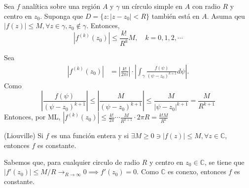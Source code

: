 \begin{prop}
    Sea $f$ analítica sobre una región $A$ y $\gamma$ un círculo simple en $A$ con radio $R$ y centro en $z_0$. Suponga que 
    $D=\{z: |z-z_0|<R\}$ también está en $A$. Asuma qeu $|f(z)|\leq M,\forall z\in \gamma,z_0\not\in \gamma$. Entonces, 
    $$|f^{(k)}(z_0)|\leq \frac{k!}{R^k}M,\quad k=0,1,2,\cdots$$
    \begin{dem}
        Sea 
        \begin{align*}
            |f^{(k)}(z_0)| &= \left|\frac{k!}{2\pi i}\right|\cdot \left|\int_\gamma \frac{f(\psi)}{(\psi -z_0)^{k+1}}d\psi\right|.
        \end{align*}
        Como 
        $$\left| \frac{f(\psi)}{(\psi -z_0)^{k+1}}\right|\leq \left| \frac{M}{(\psi -z_0)^{k+1}}\right|\leq \frac{M}{|\psi -z_0|^{k+1}}=\frac{M}{R^{k+1}}$$
        Entonces, por ML, $|f^{(k)}(z_0)|\leq \frac{k!}{2\pi}\cdots \frac{M}{R^{k+1}}\cdot 2\pi R=\frac{k!M}{R^k}$
    \end{dem}
\end{prop}

\begin{teorema}(Liouville)
    Si $f$ es una función entera y si $\exists M\geq0\ni |f(z)|\leq M,\forall z\in \mathbb{C}$, entonces $f$ es constante. 
    \begin{dem}
        Sabemos que, para cualquier circulo de radio $R$ y centro en $z_0\in \mathbb{C}$, se tiene que $|f'(z_0)|\leq M/R \to_{R\to \infty}0\implies f'(z_0)=0$. Como $\mathbb{C}$ es conexo, entonces $f$ es constante.  

    \end{dem}
\end{teorema}